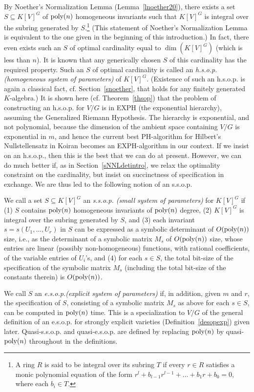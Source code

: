 \documentclass[11pt]{article}
\begin{document}
By Noether's Normalization
Lemma (Lemma~\ref{lnoether20}), there exists a set $S \subseteq K[V]^G$ of ${\mbox {poly}}(n)$
homogeneous invariants such that 
$K[V]^G$ is integral over the subring generated by $S$.\footnote{A ring $R$ is said to be integral  over its subring $T$ if every  $r \in R$ satisfies 
a monic polynomial equation of the form $r^l + b_{l-1} r^{l-1} + \ldots + b_1 r + b_0=0$, where each $b_i \in T$.}
(This statement of Noether's Normalization Lemma is equivalent to the one given in the beginning of this introduction.)
In fact, there even exists such an $S$ of optimal cardinality equal to $\dim(K[V]^G)$ (which is less than $n$). 
It is known that any generically chosen   $S$ of this cardinality has the required property. 
Such an $S$ of optimal cardinality is called an {\em h.s.o.p. (homogeneous system of parameters)} of $K[V]^G$. (Existence
of such an h.s.o.p. is again a classical fact, cf. Section~\ref{snoether}, that holds  for any  finitely generated  $K$-algebra.) 
It is shown here (cf. Theorem~\ref{thsop})
that the problem of constructing an h.s.o.p. for $V/G$ is  in EXPH (the exponential hierarchy),  assuming the Generalized Riemann Hypothesis.
The hierarchy is exponential, and not polynomial, because the dimension of the ambient space containing $V/G$ is exponential in $m$,
and hence the current best PH-algorithm for Hilbert's Nullstellensatz in Koiran \cite{koiran} becomes an EXPH-algorithm in our context.
If we insist on an h.s.o.p., then this is the best that we can do   at present.
However, we can do much better if, as in Section~\ref{sNNLdetintro}, 
we relax  the optimality constraint on the  cardinality,
but insist on succinctness of specification in exchange. We are thus led  to the following notion of an s.s.o.p.

We call a set $S \subseteq K[V]^G$ an {\em s.s.o.p. (small   system of parameters)} for $K[V]^G$ if 
(1) $S$ contains ${\mbox {poly}}(n)$ homogeneous  invariants of ${\mbox {poly}}(n)$ degree, 
(2)  $K[V]^G$ is integral over the subring generated by $S$, and 
(3)  each invariant $s=s(U_1,\ldots,U_r)$ in $S$  can be expressed as a symbolic determinant of $O({\mbox {poly}}(n))$ size, i.e., 
as the determinant of a symbolic matrix $M_s$ of $O({\mbox {poly}}(n))$ size, 
whose  entries are linear (possibly non-homogeneous) functions, with rational coefficients,
of the variable 
entries of $U_i$'s, and (4) for each $s \in S$, 
the total bit-size of the specification of the symbolic matrix $M_s$ (including the total bit-size of 
the constants therein)  is    $O({\mbox {poly}}(n))$.

We call $S$  an {\em e.s.o.p.(explicit system of parameters)} if, in addition,
given $m$ and $r$, the specification of $S$,
consisting of a symbolic matrix $M_s$ 
as above for each $s \in S$, can be computed in ${\mbox {poly}}(n)$ time. This is a specialization to $V/G$ of the general definition 
of an e.s.o.p. for strongly explicit varieties (Definition~\ref{desopexp}) given later.
Quasi-s.s.o.p. and quasi-e.s.o.p. are defined by replacing 
${\mbox {poly}}(n)$  by quasi-${\mbox {poly}}(n)$ throughout in the definitions.
\end{document}
